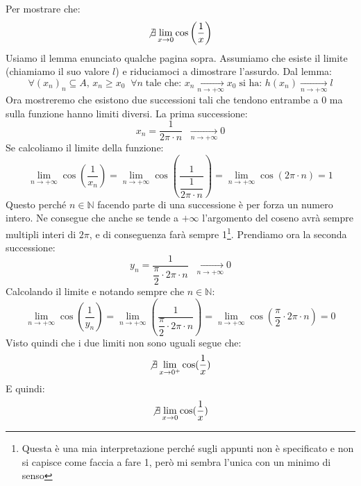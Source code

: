 \begin{itemize}
	Per mostrare che:
	\begin{equation*}
		\not \exists \lim_{x \to 0} \cos \left(\dfrac{1}{x}\right)
	\end{equation*}
	Usiamo il lemma enunciato qualche pagina sopra. Assumiamo che esiste il limite (chiamiamo il suo valore $l$) e riduciamoci a dimostrare l'assurdo. Dal lemma:
	\begin{equation*}
		\forall (x_n)_n \subseteq A, \, x_n \geq x_0 \;\; \forall n \; \text{tale che: } x_n \xrightarrow[n \to + \infty]{} x_0 \; \text{si ha: } h(x_n) \xrightarrow[n \to +\infty]{} l
	\end{equation*}
	Ora mostreremo che esistono due successioni tali che tendono entrambe a $0$ ma sulla funzione hanno limiti diversi. La prima successione:
	\begin{equation*}
		x_n = \dfrac{1}{2 \pi \cdot n} \;\; \xrightarrow[n \to +\infty]{} 0
	\end{equation*}
	Se calcoliamo il limite della funzione:
	\begin{equation*}
		\lim_{n \to +\infty} \cos \left(\dfrac{1}{x_n}\right) = \lim_{n \to +\infty} \cos \left(\dfrac{1}{\dfrac{1}{2 \pi \cdot n}}\right) = \lim_{n \to +\infty} \cos(2\pi \cdot n) = 1
	\end{equation*}
	Questo perché $n \in \mathbb{N}$ facendo parte di una successione è per forza un numero intero. Ne consegue che anche se tende a $+\infty$ l'argomento del coseno avrà sempre multipli interi di $2\pi$, e di conseguenza farà sempre 1\footnote{Questa è una mia interpretazione perché sugli appunti non è specificato e non si capisce come faccia a fare 1, però mi sembra l'unica con un minimo di senso}. Prendiamo ora la seconda successione:
	\begin{equation*}
		y_n = \dfrac{1}{\dfrac{\pi}{2} \cdot 2\pi \cdot n} \;\; \xrightarrow[n \to +\infty]{} 0
	\end{equation*}
	Calcolando il limite e notando sempre che $n \in \mathbb{N}$:
	\begin{equation*}
		\lim_{n \to +\infty} \cos \left( \dfrac{1}{y_n} \right) = \lim_{n \to +\infty} \left(  \dfrac{1}{\dfrac{\pi}{2} \cdot 2\pi \cdot n} \right) = \lim_{n \to +\infty} \cos \left( \dfrac{\pi}{2} \cdot 2\pi \cdot n \right) = 0
	\end{equation*}
	Visto quindi che i due limiti non sono uguali segue che:
	\begin{equation*}
        \not \exists \lim_{x \to 0^+} \cos(\dfrac{1}{x}) 
	\end{equation*}
	E quindi:
	\begin{equation*}
        \not \exists \lim_{x \to 0} \cos(\dfrac{1}{x}) 
	\end{equation*}


\end{itemize}

